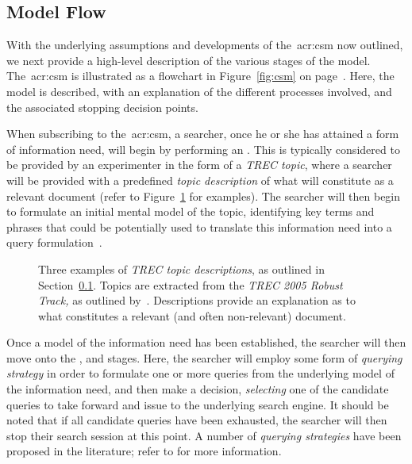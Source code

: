 \subsection{Model Flow}\label{sec:proposal:csm:flow}
With the underlying assumptions and developments of the~\gls{acr:csm} now outlined, we next provide a high-level description of the various stages of the model. The~\gls{acr:csm} is illustrated as a flowchart in Figure~\ref{fig:csm} on page~\pageref{fig:csm}. Here, the model is described, with an explanation of the different processes involved, and the associated stopping decision points.

When subscribing to the~\gls{acr:csm}, a searcher, once he or she has attained a form of information need, will begin by performing an . This is typically considered to be provided by an experimenter in the form of a \emph{TREC topic}, where a searcher will be provided with a predefined \emph{topic description} of what will constitute as a relevant document (refer to Figure~\ref{fig:topics} for examples). The searcher will then begin to formulate an initial mental model of the topic, identifying key terms and phrases that could be potentially used to translate this information need into a query formulation~\citep{borlund2003iir_model}.

\begin{figure}[t!]
    \centering
    \caption[Examples of TREC Topics]{Three examples of \emph{TREC topic descriptions}, as outlined in Section~\ref{sec:proposal:csm:flow}. Topics are extracted from the \emph{TREC 2005 Robust Track,} as outlined by~\cite{voorhees2006trec_robust}. Descriptions provide an explanation as to what constitutes a relevant (and often non-relevant) document.}
    \label{fig:topics}
\end{figure}

Once a model of the information need has been established, the searcher will then move onto the ,  and  stages. Here, the searcher will employ some form of \emph{querying strategy} in order to formulate one or more queries from the underlying model of the information need, and then make a decision, \emph{selecting} one of the candidate queries to take forward and issue to the underlying search engine. It should be noted that if all candidate queries have been exhausted, the searcher will then stop their search session at this point. A number of \emph{querying strategies} have been proposed in the literature; refer to  for more information.

